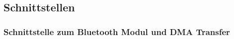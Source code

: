 

\subsection{Schnittstellen}


\subsubsection{Schnittstelle zum Bluetooth Modul und DMA Transfer}


